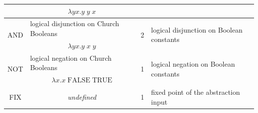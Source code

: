 \documentclass[table, a4paper, 10pt]{book}
\begin{document}
\begin{table}[H]
\begin{tabular}{cclcl}
\multicolumn{1}{|c|}{}                        & \multicolumn{2}{c|}{$\lambda yx.y\;y\;x$}                                                                                                   & \multicolumn{1}{c|}{}                   & \multicolumn{1}{l|}{}                                                                                                                                             \\ \hline
\multicolumn{1}{|c|}{\multirow{2}{*}{AND}}    & \multicolumn{2}{l|}{logical disjunction on Church Booleans}                                                                                 & \multicolumn{1}{c|}{\multirow{2}{*}{2}} & \multicolumn{1}{l|}{\multirow{2}{*}{logical disjunction on Boolean constants}}                                                                                    \\ \cline{2-3}
\multicolumn{1}{|c|}{}                        & \multicolumn{2}{c|}{$\lambda yx.y\;x\;y$}                                                                                                   & \multicolumn{1}{c|}{}                   & \multicolumn{1}{l|}{}                                                                                                                                             \\ \hline
\multicolumn{1}{|c|}{\multirow{2}{*}{NOT}}    & \multicolumn{2}{l|}{logical negation on Church Booleans}                                                                                    & \multicolumn{1}{c|}{\multirow{2}{*}{1}} & \multicolumn{1}{l|}{\multirow{2}{*}{logical negation on Boolean constants}}                                                                                       \\ \cline{2-3}
\multicolumn{1}{|c|}{}                        & \multicolumn{2}{c|}{$\lambda x.x\;\mathrm{FALSE}\;\mathrm{TRUE}$}                                                                           & \multicolumn{1}{c|}{}                   & \multicolumn{1}{l|}{}                                                                                                                                             \\ \hline
\multicolumn{1}{|c|}{\multirow{2}{*}{FIX}}    & \multicolumn{2}{c|}{\multirow{2}{*}{\textit{undefined}}}                                                                                    & \multicolumn{1}{c|}{\multirow{2}{*}{1}} & \multicolumn{1}{l|}{\multirow{2}{*}{fixed point of the abstraction input}}                                                                                        \\

\end{tabular}
\end{table}
\end{document}
